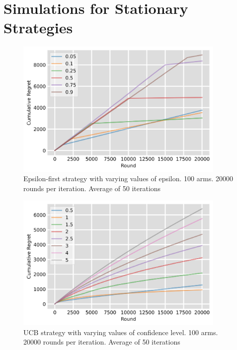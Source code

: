 \section{Simulations for Stationary Strategies}\label{sec:simulations-for-stationary-strategies}
\begin{figure}[h]
    \centering
    \includegraphics[width=0.9\textwidth]{figures/epsilon_plot}
    \caption[Epsilon-first strategy with varying values of epsilon]{Epsilon-first strategy with varying values of epsilon. 100 arms. 20000 rounds per iteration. Average of 50 iterations}
    \label{fig: epsilon}
\end{figure}

\begin{figure}[h]
    \centering
    \includegraphics[width=0.9\textwidth]{figures/ucb_plot}
    \caption[UCB strategy with varying values of confidence level]{UCB strategy with varying values of confidence level. 100 arms. 20000 rounds per iteration. Average of 50 iterations}
    \label{fig: ucb}
\end{figure}

